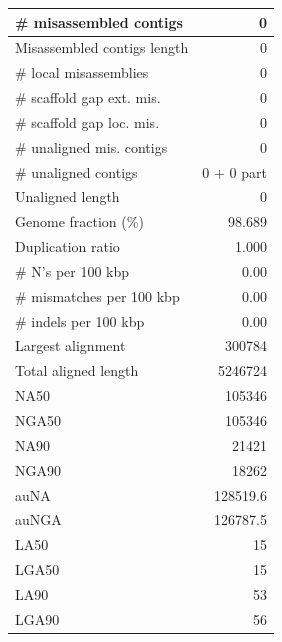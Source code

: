 \documentclass[12pt,a4paper]{article}
\begin{document}
\begin{table}[ht]
\begin{center}
\begin{tabular}{|l*{1}{|r}|}
\# misassembled contigs & 0 \\ \hline
Misassembled contigs length & 0 \\ \hline
\# local misassemblies & 0 \\ \hline
\# scaffold gap ext. mis. & 0 \\ \hline
\# scaffold gap loc. mis. & 0 \\ \hline
\# unaligned mis. contigs & 0 \\ \hline
\# unaligned contigs & 0 + 0 part \\ \hline
Unaligned length & 0 \\ \hline
Genome fraction (\%) & 98.689 \\ \hline
Duplication ratio & 1.000 \\ \hline
\# N's per 100 kbp & 0.00 \\ \hline
\# mismatches per 100 kbp & 0.00 \\ \hline
\# indels per 100 kbp & 0.00 \\ \hline
Largest alignment & 300784 \\ \hline
Total aligned length & 5246724 \\ \hline
NA50 & 105346 \\ \hline
NGA50 & 105346 \\ \hline
NA90 & 21421 \\ \hline
NGA90 & 18262 \\ \hline
auNA & 128519.6 \\ \hline
auNGA & 126787.5 \\ \hline
LA50 & 15 \\ \hline
LGA50 & 15 \\ \hline
LA90 & 53 \\ \hline
LGA90 & 56 \\ \hline
\end{tabular}
\end{center}
\end{table}
\end{document}
